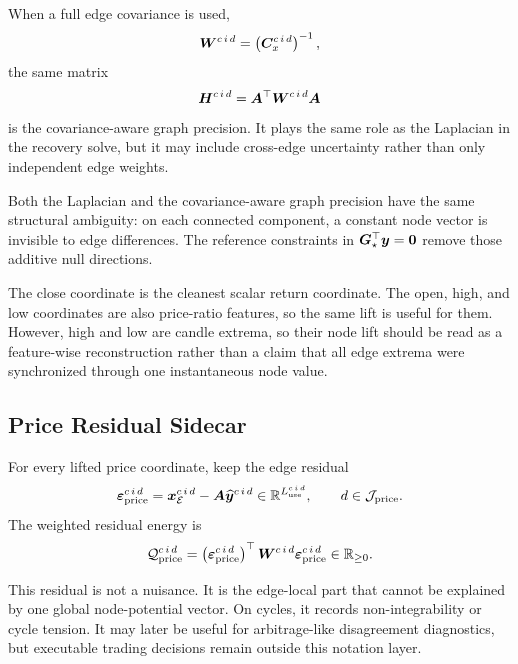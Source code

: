 When a full edge covariance is used,
\[
  \bm{W}^{c\,i\,d}
  =
  \left(
    \bm{C}_{x}^{c\,i\,d}
  \right)^{-1},
\]
the same matrix
\[
  \bm{H}^{c\,i\,d}
  =
  \bm{A}^{\top}
  \bm{W}^{c\,i\,d}
  \bm{A}
\]
is the covariance-aware graph precision.  It plays the same role as the
Laplacian in the recovery solve, but it may include cross-edge uncertainty
rather than only independent edge weights.

Both the Laplacian and the covariance-aware graph precision have the same
structural ambiguity: on each connected component, a constant node vector is
invisible to edge differences.  The reference constraints in
$\bm{G}_{\star}^{\top}\bm{y}=\bm{0}$ remove those additive null directions.

The close coordinate is the cleanest scalar return coordinate.  The open, high,
and low coordinates are also price-ratio features, so the same lift is useful
for them.  However, high and low are candle extrema, so their node lift should
be read as a feature-wise reconstruction rather than a claim that all edge
extrema were synchronized through one instantaneous node value.

\subsection{Price Residual Sidecar}
\label{subsec:price-residual-sidecar}

For every lifted price coordinate, keep the edge residual
\[
  \bm{\varepsilon}_{\mathrm{price}}^{c\,i\,d}
  =
  \bm{x}_{\mathcal{E}}^{c\,i\,d}
  -
  \bm{A}
  \widehat{\bm{y}}^{c\,i\,d}
  \in
  \mathbb{R}^{L_{\mathrm{use}}^{c\,i\,d}},
  \qquad
  d\in\mathcal{J}_{\mathrm{price}}.
\]
The weighted residual energy is
\[
  \mathcal{Q}_{\mathrm{price}}^{c\,i\,d}
  =
  \left(
    \bm{\varepsilon}_{\mathrm{price}}^{c\,i\,d}
  \right)^{\top}
  \bm{W}^{c\,i\,d}
  \bm{\varepsilon}_{\mathrm{price}}^{c\,i\,d}
  \in
  \mathbb{R}_{\ge 0}.
\]

This residual is not a nuisance.  It is the edge-local part that cannot be
explained by one global node-potential vector.  On cycles, it records
non-integrability or cycle tension.  It may later be useful for arbitrage-like
disagreement diagnostics, but executable trading decisions remain outside this
notation layer.


